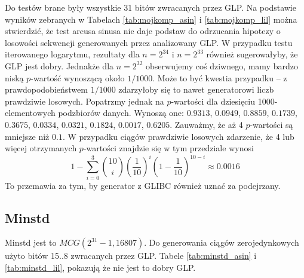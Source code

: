 \documentclass[a4paper,11pt,twoside]{book}
\theoremstyle{definition}
\begin{document}
Do testów brane były wszystkie 31 bitów zwracanych przez GLP. Na podstawie wyników zebranych w Tabelach \ref{tab:mojkomp_asin} i \ref{tab:mojkomp_lil} można stwierdzić, że test arcusa sinusa nie daje podstaw do odrzucania hipotezy o losowości sekwencji generowanych przez analizowany GLP. W przypadku testu iterowanego logarytmu, rezultaty dla $n=2^{34}$ i $n=2^{33}$ również sugerowałyby, że GLP jest dobry. Jednakże dla $n=2^{32}$ obserwujemy coś dziwnego, mamy bardzo niską $p$-wartość wynoszącą około $1/1000$. Może to być kwestia przypadku -- z prawdopodobieństwem $1/1000$ zdarzyłoby się to nawet generatorowi liczb prawdziwie losowych. Popatrzmy jednak na $p$-wartości dla dziesięciu 1000-elementowych podzbiorów danych. Wynoszą one: $0.9313$, $0.0949$, $0.8859$, $0.1739$, $0.3675$, $0.0334$, $0.0321$, $0.1824$, $0.0017$, $0.6205$. Zauważmy, że aż 4 $p$-wartości są mniejsze niż $0.1$. W przypadku ciągów prawdziwie losowych zdarzenie, że 4 lub więcej otrzymanych $p$-wartości znajdzie się w tym przedziale wynosi
\[ 1 - \sum_{i=0}^3 \binom{10}{i} \left(\frac{1}{10}\right)^{i} \left(1 - \frac{1}{10}\right)^{10-i} \approx 0.0016 \]
To przemawia za tym, by generator z GLIBC również uznać za podejrzany.

\FloatBarrier
\subsection{Minstd}
Minstd jest to $MCG(2^{31}-1, 16807)$. Do generowania ciągów zerojedynkowych użyto bitów 15..8 zwracanych przez GLP. Tabele \ref{tab:minstd_asin} i \ref{tab:minstd_lil}, pokazują że nie jest to dobry GLP. 
\end{document}
